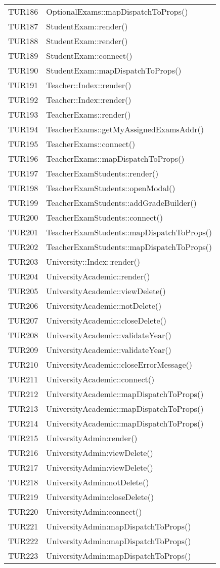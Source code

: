 \documentclass[PianoDiQualifica.tex]{subfiles}
\begin{document}
\begin{longtable}[H]{P{5cm}P{9cm}}
	TUR186 & OptionalExams::mapDispatchToProps() \\
	TUR187 & StudentExam::render() \\
	TUR188 & StudentExam::render() \\
	TUR189 & StudentExam::connect() \\
	TUR190 & StudentExam::mapDispatchToProps() \\
	TUR191 & Teacher::Index::render() \\
	TUR192 & Teacher::Index::render() \\
	TUR193 & TeacherExams::render() \\
	TUR194 & TeacherExams::getMyAssignedExamsAddr() \\
	TUR195 & TeacherExams::connect() \\
	TUR196 & TeacherExams::mapDispatchToProps() \\
	TUR197 & TeacherExamStudents::render() \\
	TUR198 & TeacherExamStudents::openModal() \\
	TUR199 & TeacherExamStudents::addGradeBuilder() \\
	TUR200 & TeacherExamStudents::connect() \\
	TUR201 & TeacherExamStudents::mapDispatchToProps() \\
	TUR202 & TeacherExamStudents::mapDispatchToProps() \\
	TUR203 & University::Index::render() \\
	TUR204 & UniversityAcademic::render() \\
	TUR205 & UniversityAcademic::viewDelete() \\
	TUR206 & UniversityAcademic::notDelete() \\
	TUR207 & UniversityAcademic::closeDelete() \\
	TUR208 & UniversityAcademic::validateYear() \\
	TUR209 & UniversityAcademic::validateYear() \\
	TUR210 & UniversityAcademic::closeErrorMessage() \\
	TUR211 & UniversityAcademic::connect() \\
	TUR212 & UniversityAcademic::mapDispatchToProps() \\
	TUR213 & UniversityAcademic::mapDispatchToProps() \\
	TUR214 & UniversityAcademic::mapDispatchToProps() \\
	TUR215 & UniversityAdmin:render()  \\
	TUR216 & UniversityAdmin:viewDelete() \\
	TUR217 & UniversityAdmin:viewDelete() \\
	TUR218 & UniversityAdmin:notDelete() \\
	TUR219 & UniversityAdmin:closeDelete() \\
	TUR220 & UniversityAdmin:connect() \\
	TUR221 & UniversityAdmin:mapDispatchToProps() \\
	TUR222 & UniversityAdmin:mapDispatchToProps() \\
	TUR223 & UniversityAdmin:mapDispatchToProps() \\
	

\end{longtable}
\end{document}
